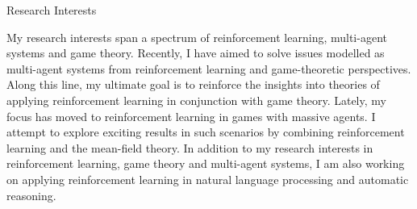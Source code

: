 \documentclass{resume} %
\begin{document}
\begin{rSection}{Research Interests}

My research interests span a spectrum of reinforcement learning, multi-agent systems and game theory. %
Recently, I have aimed to solve issues modelled as multi-agent systems from reinforcement learning and game-theoretic perspectives. Along this line, my ultimate goal is to reinforce the insights into theories of applying reinforcement learning in conjunction with game theory. Lately, my focus has moved to reinforcement learning in games with massive agents. I attempt to explore exciting results in such scenarios by combining reinforcement learning and the mean-field theory. In addition to my research interests in reinforcement learning, game theory and multi-agent systems, I am also working on applying reinforcement learning in natural language processing and automatic reasoning.

\end{rSection}


\end{document}
